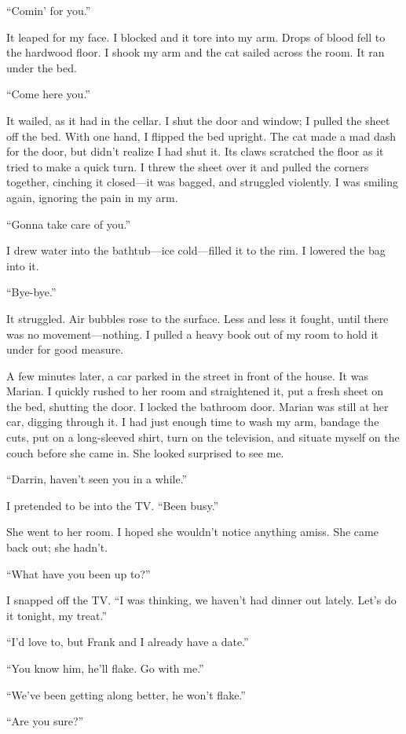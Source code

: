 ``Comin' for you.''

It leaped for my face. I blocked and it tore into my arm. Drops of blood
fell to the hardwood floor. I shook my arm and the cat sailed across the
room. It ran under the bed.

``Come here you.''

It wailed, as it had in the cellar. I shut the door and window; I pulled
the sheet off the bed. With one hand, I flipped the bed upright. The cat
made a mad dash for the door, but didn't realize I had shut it. Its
claws scratched the floor as it tried to make a quick turn. I threw the
sheet over it and pulled the corners together, cinching it closed---it
was bagged, and struggled violently. I was smiling again, ignoring the
pain in my arm.

``Gonna take care of you.''

I drew water into the bathtub---ice cold---filled it to the rim. I
lowered the bag into it.

``Bye-bye.''

It struggled. Air bubbles rose to the surface. Less and less it fought,
until there was no movement---nothing. I pulled a heavy book out of my
room to hold it under for good measure.

A few minutes later, a car parked in the street in front of the house.
It was Marian. I quickly rushed to her room and straightened it, put a
fresh sheet on the bed, shutting the door. I locked the bathroom door.
Marian was still at her car, digging through it. I had just enough time
to wash my arm, bandage the cuts, put on a long-sleeved shirt, turn on
the television, and situate myself on the couch before she came in. She
looked surprised to see me.

``Darrin, haven't seen you in a while.''

I pretended to be into the TV. ``Been busy.''

She went to her room. I hoped she wouldn't notice anything amiss. She
came back out; she hadn't.

``What have you been up to?''

I snapped off the TV. ``I was thinking, we haven't had dinner out
lately. Let's do it tonight, my treat.''

``I'd love to, but Frank and I already have a date.''

``You know him, he'll flake. Go with me.''

``We've been getting along better, he won't flake.''

``Are you sure?''


